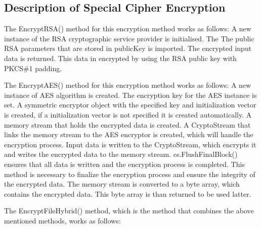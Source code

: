 \documentclass[a4paper,oneside,11pt]{book}
\begin{document}
\subsection{Description of Special Cipher Encryption}

The EncryptRSA() method for this encryption method works as follows:
A new instance of the RSA cryptographic service provider is initialised. The The public RSA parameters that are stored in publicKey is imported. The encrypted input data is returned. This data in encrypted by using the RSA public key with PKCS\#1 padding.

The EncryptAES() method for this encryption method works as follows:
A new instance of AES algorithm is created. The encryption key for the AES instance is set. A symmetric encryptor object with the specified key and initialization vector is created, if a initialization vector is not specified it is created automatically. A memory stream that holds the encrypted data is created. A CryptoStream that links the memory stream to the AES encryptor is created, which will handle the encryption process. Input data is written to the CryptoStream, which encrypts it and writes the encrypted data to the memory stream. cs.FlushFinalBlock() ensures that all data is written and the encryption process is completed. This method is necessary to finalize the encryption process and ensure the integrity of the encrypted data. The memory stream is converted to a byte array, which contains the encrypted data. This byte array is than returned to be used latter.

The EncryptFileHybrid() method, which is the method that combines the above mentioned methods, works as follows:
\end{document}
